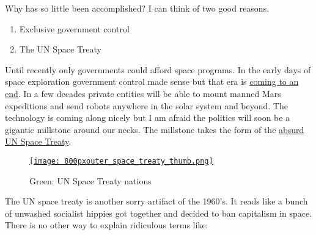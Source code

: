 Why has so little been accomplished? I can think of two good reasons.

\begin{enumerate}
\item
  Exclusive government control
\item
  The UN Space Treaty
\end{enumerate}
Until recently only governments could afford space programs. In the
early days of space exploration government control made sense but that
era is \href{http://www.spacex.com/}{coming to an end}. In a few decades
private entities will be able to mount manned Mars expeditions and send
robots anywhere in the solar system and beyond. The technology is coming
along nicely but I am afraid the politics will soon be a gigantic
millstone around our necks. The millstone takes the form of the
\href{http://www.oosa.unvienna.org/oosa/SpaceLaw/outerspt.html}{absurd
UN Space Treaty}.


\captionsetup[figure]{labelformat=empty}
\begin{figure}[htbp]
\centering
\href{http://en.wikipedia.org/wiki/Outer\_Space\_Treaty}{\texttt{[image: 800pxouter\_space\_treaty\_thumb.png]}}
\caption{Green:  UN Space Treaty  nations}
\label{fig:1022X1}
\end{figure} 

The UN space treaty is another sorry artifact of the 1960's. It reads
like a bunch of unwashed socialist hippies got together and decided to
ban capitalism in space. There is no other way to explain ridiculous
terms like:

